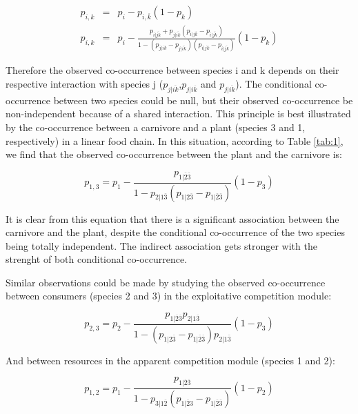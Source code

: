 \begin{eqnarray}
  \nonumber p_{i,k} &=& p_i-p_{i,\overline{k}}(1-p_k) \\
  p_{i,k}&=& p_i-\frac{p_{i|\overline{jk}}+ p_{j|\overline{ik}} (p_{i|j\overline{k}}- p_{i|\overline{jk}})}{1- (p_{j|i\overline{k}}-p_{j|\overline{ik}})( p_{i|j\overline{k}} - p_{i|\overline{jk}})}(1-p_k)
\end{eqnarray}

Therefore the observed co-occurrence between species i and k depends on their
respective interaction with species j
($p_{j|\overline{ik}}$,$p_{j|i\overline{k}}$ and $p_{j|\overline{ik}}$). The
conditional co-occurrence between two species could be null, but their
observed co-occurrence be non-independent because of a shared interaction.
This principle is best illustrated by the co-occurrence between a carnivore
and a plant (species 3 and 1, respectively) in a linear food chain. In
this situation, according to Table \ref{tab:1}, we find that the observed co-occurrence
between the plant and the carnivore is:

\begin{equation} \label{linear}
  p_{1,3} = p_1-\frac{p_{1|\overline{2}\overline{3}}}{1-p_{2|1\overline{3}}( p_{1|2\overline{3}} - p_{1|\overline{2}\overline{3}})}(1-p_3)
\end{equation}

It is clear from this equation that there is a significant association between
the carnivore and the plant, despite the conditional co-occurrence of the two
species being totally independent. The indirect association gets stronger with
the strenght of both conditional co-occurrence.

Similar observations could be made by studying the observed co-occurrence between
consumers (species 2 and 3) in the exploitative competition module:

\begin{equation} \label{exploitative}
  p_{2,3} = p_2-\frac{p_{1|\overline{2}\overline{3}}p_{2|1\overline{3}}}{1- (p_{1|2\overline{3}}-p_{1|\overline{2}\overline{3}})p_{2|1\overline{3}}}(1-p_3)
\end{equation}

And between resources in the apparent competition module (species 1 and 2):

\begin{equation} \label{apparent}
  p_{1,2} = p_1-\frac{p_{1|\overline{2}\overline{3}}}{1- p_{3|1\overline{2}}( p_{1|\overline{2}3} - p_{1|\overline{2}\overline{3}})}(1-p_2)
\end{equation}

